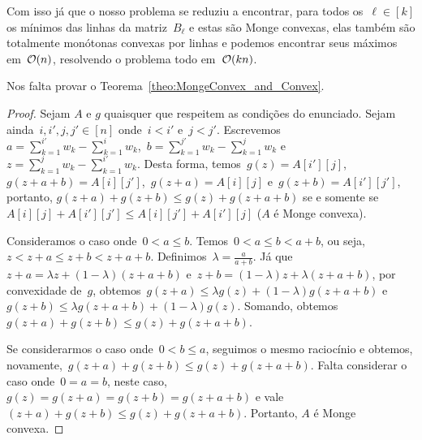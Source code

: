 Com isso já que o nosso problema se reduziu a encontrar, para todos os~$\ell \in [k]$ os mínimos das linhas da matriz~$B_\ell$ e estas são Monge convexas, elas também são totalmente monótonas convexas por linhas e podemos encontrar seus máximos em~$\mathcal{O}(n)$, resolvendo o problema todo em~$\mathcal{O}(kn)$.

Nos falta provar o Teorema~\ref{theo:MongeConvex_and_Convex}.

\begin{proof}
Sejam $A$ e $g$ quaisquer que respeitem as condições do enunciado. Sejam ainda~$i,i',j,j' \in [n]$ onde~$i < i'$ e~$j < j'$. Escrevemos~$a = \sum \limits_{k=1}^{i'} w_k - \sum \limits_{k=1}^{i} w_k$,~$b = \sum \limits_{k=1}^{j'} w_k - \sum \limits_{k=1}^{j} w_k$ e~$z = \sum \limits_{k=1}^{j} w_k - \sum \limits_{k=1}^{i'} w_k$. Desta forma, temos~$g(z) = A[i'][j]$,~$g(z+a+b) = A[i][j']$,~$g(z+a) = A[i][j]$ e~$g(z+b) = A[i'][j']$, portanto, $g(z+a) + g(z+b) \leq g(z) + g(z+a+b)$ se e somente se $A[i][j] + A[i'][j'] \leq A[i][j'] + A[i'][j]$ ($A$ é Monge convexa).

Consideramos o caso onde~$0 < a \leq b$. Temos~$0 < a \leq b < a+b$, ou seja,~$z < z+a \leq z+b < z+a+b$. Definimos~$\lambda = \frac{a}{a+b}$. Já que~$z+a = \lambda z + (1-\lambda)(z+a+b)$ e~$z+b = (1-\lambda)z + \lambda(z+a+b)$, por convexidade de~$g$, obtemos~$g(z+a) \leq \lambda g(z) + (1 - \lambda) g(z+a+b)$ e~$g(z+b) \leq \lambda g(z+a+b) + (1 - \lambda) g(z)$. Somando, obtemos~$g(z+a) + g(z+b) \leq g(z) + g(z+a+b)$.  

Se considerarmos o caso onde~$0 < b \leq a$, seguimos o mesmo raciocínio e obtemos, novamente,~$g(z+a) + g(z+b) \leq g(z) + g(z+a+b)$. Falta considerar o caso onde~$0 = a = b$, neste caso,~$g(z) = g(z+a) = g(z+b) = g(z+a+b)$ e vale~$(z+a) + g(z+b) \leq g(z) + g(z+a+b)$. Portanto, $A$ é Monge convexa.
\end{proof}
